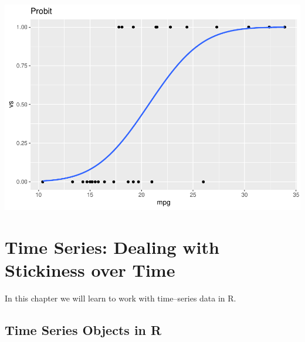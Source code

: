 \documentclass[]{book}
\newenvironment{Shaded}{\begin{snugshade}}{\end{snugshade}}
\newcommand{\DataTypeTok}[1]{\textcolor[rgb]{0.13,0.29,0.53}{#1}}
\newcommand{\KeywordTok}[1]{\textcolor[rgb]{0.13,0.29,0.53}{\textbf{#1}}}
\newcommand{\NormalTok}[1]{#1}
\newcommand{\OperatorTok}[1]{\textcolor[rgb]{0.81,0.36,0.00}{\textbf{#1}}}
\newcommand{\StringTok}[1]{\textcolor[rgb]{0.31,0.60,0.02}{#1}}
\begin{document}
\begin{Shaded}
\end{Shaded}

\includegraphics{bailey_files/figure-latex/unnamed-chunk-141-1.pdf}

\hypertarget{chp13}{%
\chapter{Time Series: Dealing with Stickiness over Time}\label{chp13}}

In this chapter we will learn to work with time--series data in R.

\hypertarget{time-series-objects-in-r}{%
\section{Time Series Objects in R}\label{time-series-objects-in-r}}
\end{document}
